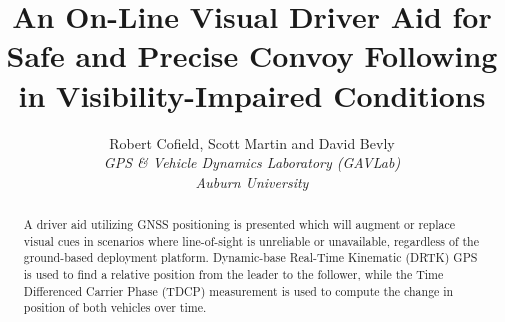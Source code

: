 \documentclass[twocolumn,10pt]{article}
\begin{document}

\title{\textbf{An On-Line Visual Driver Aid for Safe and Precise Convoy Following in Visibility-Impaired Conditions}}
\author{
  Robert Cofield, Scott Martin and David Bevly \\
  \em{GPS \& Vehicle Dynamics Laboratory (GAVLab)} \\
  \em{Auburn University} \\
}
\date{} %
\maketitle


\begin{abstract}

  A driver aid utilizing GNSS positioning is presented which will augment or replace visual cues in scenarios where line-of-sight is unreliable or unavailable, regardless of the ground-based deployment platform.
  Dynamic-base Real-Time Kinematic (DRTK) GPS is used to find a relative position from the leader to the follower, while the Time Differenced Carrier Phase (TDCP) measurement is used to compute the change in position of both vehicles over time.



  

\end{abstract}
\end{document}
